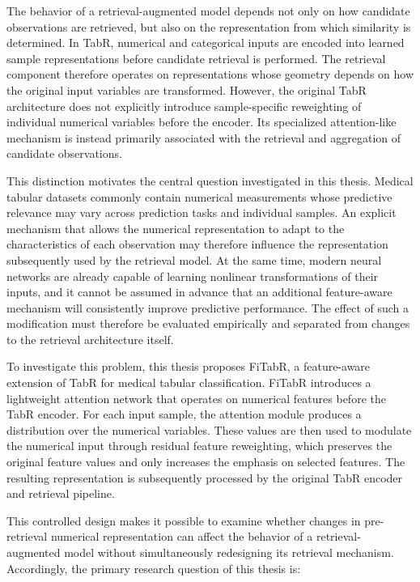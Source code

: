 \documentclass[11pt,a4paper,oneside, openany, reqno, chapter, nokorean]{oblivoir}
\theoremstyle{definition}
\theoremstyle{remark}
\numberwithin{equation}{chapter}
\theoremstyle{definition}
\theoremstyle{remark}
\theoremstyle{definition}
\begin{document}
The behavior of a retrieval-augmented model depends not only on how candidate
observations are retrieved, but also on the representation from which
similarity is determined. In TabR, numerical and categorical inputs are encoded
into learned sample representations before candidate retrieval is performed.
The retrieval component therefore operates on representations whose geometry
depends on how the original input variables are transformed. However, the
original TabR architecture does not explicitly introduce sample-specific
reweighting of individual numerical variables before the encoder. Its
specialized attention-like mechanism is instead primarily associated with the
retrieval and aggregation of candidate observations.

This distinction motivates the central question investigated in this thesis.
Medical tabular datasets commonly contain numerical measurements whose
predictive relevance may vary across prediction tasks and individual samples.
An explicit mechanism that allows the numerical representation to adapt to the
characteristics of each observation may therefore influence the representation
subsequently used by the retrieval model. At the same time, modern neural
networks are already capable of learning nonlinear transformations of their
inputs, and it cannot be assumed in advance that an additional feature-aware
mechanism will consistently improve predictive performance. The effect of such
a modification must therefore be evaluated empirically and separated from
changes to the retrieval architecture itself.

To investigate this problem, this thesis proposes FiTabR, a feature-aware
extension of TabR for medical tabular classification. FiTabR introduces a
lightweight attention network that operates on numerical features before the
TabR encoder. For each input sample, the attention module produces a
distribution over the numerical variables. These values are then used to
modulate the numerical input through residual feature reweighting, which
preserves the original feature values and only increases the emphasis on
selected features. The resulting representation is subsequently processed by
the original TabR encoder and retrieval pipeline.

This controlled design makes it possible to examine whether changes in
pre-retrieval numerical representation can affect the behavior of a
retrieval-augmented model without simultaneously redesigning its retrieval
mechanism. Accordingly, the primary research question of this thesis is:
\end{document}
